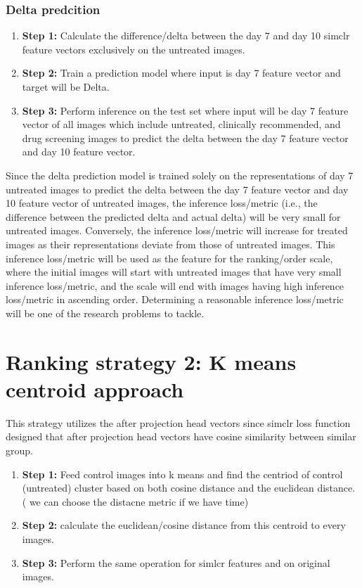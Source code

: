 \subsubsection{Delta predcition}
\begin{enumerate}
  \item \textbf{Step 1:} Calculate the difference/delta between the day 7 and day 10 simclr 
  feature vectors  exclusively on the untreated images.
  \item \textbf{Step 2:} Train a prediction model where input is day 7 feature vector 
  and target will be Delta.


  \item \textbf{Step 3:} Perform inference on the test set where input will be day 7 feature vector of all images which include untreated, 
  clinically recommended, and drug screening images to predict the delta between the day 7 feature vector  and day 10 feature vector.
\end{enumerate}

Since the delta prediction model is trained solely on the representations of day 
7 untreated  images to predict the delta between the day 7 feature vector 
and day 10 feature vector of untreated images,
 the inference loss/metric (i.e., the difference between the predicted delta and actual
  delta) will be very small for untreated images. Conversely,
   the inference loss/metric will increase for treated images as their representations 
   deviate from those of untreated images. This inference loss/metric will be used as 
   the feature for the ranking/order scale, where the initial images will start with 
   untreated images that have very small inference loss/metric, and the scale will end 
   with images having high inference loss/metric in ascending order. 
   Determining a reasonable inference loss/metric will be one of the research problems 
   to tackle.



\section{Ranking strategy 2: K means centroid approach}

This strategy utilizes the after projection head vectors since simclr loss function designed that after projection head vectors have cosine similarity between similar 
group.

\begin{enumerate}
  \item \textbf{Step 1:} Feed control images into k means and find the centriod of control (untreated) cluster based on both cosine distance and the euclidean distance. 
  ( we can choose the distacne metric if we have time)
  
  \item \textbf{Step 2:} calculate the euclidean/cosine distance from this centroid to every images.
  
  \item \textbf{Step 3:} Perform the same operation for simlcr features and on original images.
\end{enumerate}


